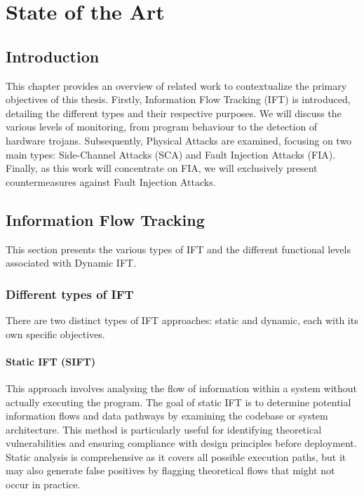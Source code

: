 \chapter{State of the Art}
\label{chapter:soa}
\minitoc


\section{Introduction}
This chapter provides an overview of related work to contextualize the primary objectives of this thesis. Firstly, Information Flow Tracking (IFT) is introduced, detailing the different types and their respective purposes. We will discuss the various levels of monitoring, from program behaviour to the detection of hardware trojans.
Subsequently, Physical Attacks are examined, focusing on two main types: Side-Channel Attacks (SCA) and Fault Injection Attacks (FIA).
Finally, as this work will concentrate on FIA, we will exclusively present countermeasures against Fault Injection Attacks.

\section{Information Flow Tracking}
This section presents the various types of IFT and the different functional levels associated with Dynamic IFT.

    \subsection{Different types of IFT}
    There are two distinct types of IFT approaches: static and dynamic, each with its own specific objectives.

        \subsubsection{Static IFT (SIFT)}
        This approach involves analysing the flow of information within a system without actually executing the program. The goal of static IFT is to determine potential information flows and data pathways by examining the codebase or system architecture. This method is particularly useful for identifying theoretical vulnerabilities and ensuring compliance with design principles before deployment. Static analysis is comprehensive as it covers all possible execution paths, but it may also generate false positives by flagging theoretical flows that might not occur in practice.

